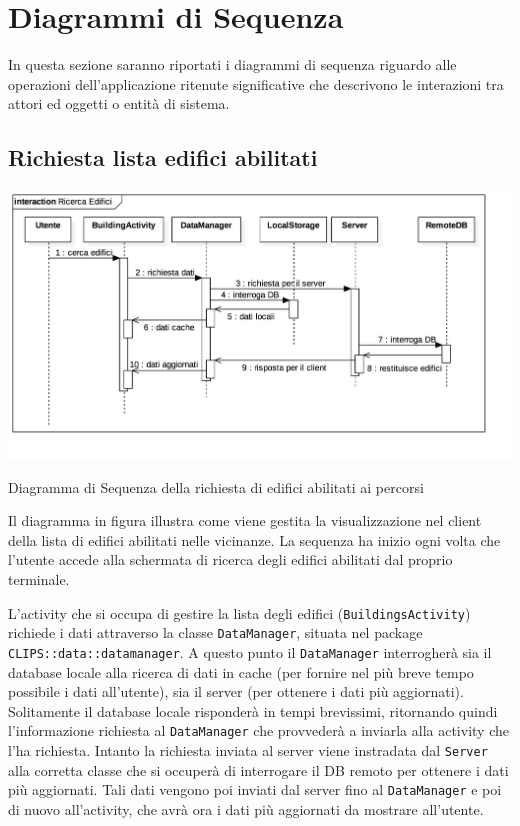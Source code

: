 \section{Diagrammi di Sequenza}
\label{sec:Diagrammi di Sequenza}

In questa sezione saranno riportati i diagrammi di sequenza riguardo alle operazioni dell'applicazione ritenute significative che descrivono le interazioni tra attori ed oggetti o entità di sistema.

\subsection{Richiesta lista edifici abilitati}
\label{sub:Richiesta lista edifici abilitati}

\includegraphics[scale=0.28]{img/diagrammiSequenza/ricercaEdifici.png}
\caption{Diagramma di Sequenza della richiesta di edifici abilitati ai percorsi}

Il diagramma in figura illustra come viene gestita la visualizzazione nel client della lista di edifici abilitati nelle vicinanze.
La sequenza ha inizio ogni volta che l'utente accede alla schermata di ricerca degli edifici abilitati dal proprio terminale.

L'activity che si occupa di gestire la lista degli edifici (\texttt{BuildingsActivity}) richiede i dati attraverso la classe \texttt{DataManager}, situata nel package \texttt{CLIPS::data::datamanager}.
A questo punto il \texttt{DataManager} interrogherà sia il database locale alla ricerca di dati in cache (per fornire nel più breve tempo possibile i dati all'utente), sia il server (per ottenere i dati più aggiornati).
Solitamente il database locale risponderà in tempi brevissimi, ritornando quindi l'informazione richiesta al \texttt{DataManager} che provvederà a inviarla alla activity che l'ha richiesta.
Intanto la richiesta inviata al server viene instradata dal \texttt{Server} alla corretta classe che si occuperà di interrogare il DB remoto per ottenere i dati più aggiornati.
Tali dati vengono poi inviati dal server fino al \texttt{DataManager} e poi di nuovo all'activity, che avrà ora i dati più aggiornati da mostrare all'utente.


